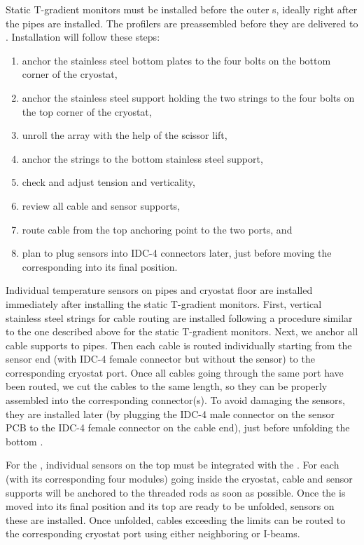 Static T-gradient monitors %
must be installed before the outer s, ideally %
right after the pipes are installed. The profilers %
are preassembled before they are delivered to \surf. 
Installation will follow these steps:
\begin{enumerate}
\item anchor the stainless steel bottom plates to the four bolts on the bottom corner of the cryostat,
\item anchor the stainless steel support holding the two strings to the four bolts on the top corner of the cryostat,
\item unroll the array with the help of the scissor lift,
\item anchor the strings to the bottom stainless steel support,   
\item check and adjust tension and verticality,
\item review all cable and sensor supports, 
\item route cable from the top anchoring point to the two  ports, and 
\item plan to plug sensors into IDC-4 connectors later, just before moving the corresponding  into its final position. 
\end{enumerate}

Individual temperature sensors on pipes and cryostat floor %
are installed immediately after installing the static T-gradient monitors. First, vertical stainless steel strings for cable routing %
are installed following a procedure similar to the one described above for the static T-gradient monitors. Next, we anchor all cable supports to pipes. Then each cable %
is routed individually starting from the sensor end (with IDC-4 female connector but without the sensor)
to the corresponding cryostat port. Once all cables going through the same port have been routed, we cut the cables to the same length, so they can be properly assembled into the corresponding connector(s). To avoid damaging the sensors, they are installed later (by plugging the IDC-4 male connector on the sensor PCB to the IDC-4 female connector on the cable end), just before unfolding the bottom .

For the , individual sensors on the top  must be integrated with the . For each  (with its corresponding four   modules)
going inside the cryostat, cable and sensor supports will be anchored to the   threaded rods as soon as possible.
Once the  is moved into its final position and its top  are ready to be unfolded, sensors on these  %
are installed. Once unfolded, cables 
exceeding the  limits can be routed to the corresponding cryostat port using either neighboring  or  I-beams. 



